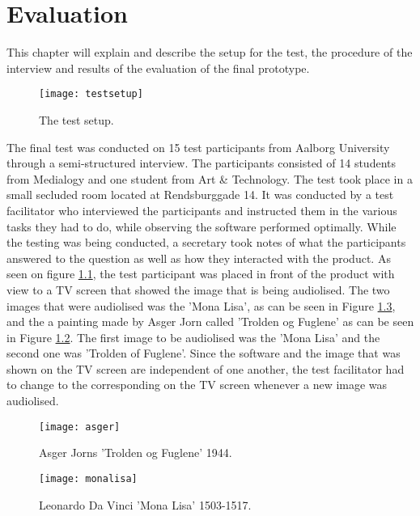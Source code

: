 \chapter{Evaluation}\label{ch:evaluation}

This chapter will explain and describe the setup for the test, the procedure of the interview and results of the evaluation of the final prototype. 

\begin{figure}[!h] 
\centering
\texttt{[image: testsetup]}
\caption{\label{fig:testsetup} The test setup.}
\end{figure}

The final test was conducted on 15 test participants from Aalborg University through a semi-structured interview. The participants consisted of 14 students from Medialogy and one student from Art \& Technology. The test took place in a small secluded room located at Rendsburggade 14. It was conducted by a test facilitator who interviewed the participants and instructed them in the various tasks they had to do, while observing the software performed optimally. While the testing was being conducted, a secretary took notes of what the participants answered to the question as well as how they interacted with the product.
As seen on figure \ref{fig:testsetup}, the test participant was placed in front of the product with view to a TV screen that showed the image that is being audiolised. The two images that were audiolised was the 'Mona Lisa', as can be seen in Figure \ref{fig:monalisa}, and the a painting made by Asger Jorn called 'Trolden og Fuglene' as can be seen in Figure \ref{fig:asger}. The first image to be audiolised was the 'Mona Lisa' and the second one was 'Trolden of Fuglene'. Since the software and the image that was shown on the TV screen are independent of one another, the test facilitator had to change to the corresponding on the TV screen whenever a new image was audiolised. 

\begin{figure}[!h] 
\centering
\texttt{[image: asger]}
\caption{\label{fig:asger} Asger Jorns 'Trolden og Fuglene' 1944.}
\end{figure}

\begin{figure}[!h] 
\centering
\texttt{[image: monalisa]}
\caption{\label{fig:monalisa} Leonardo Da Vinci 'Mona Lisa' 1503-1517.}
\end{figure}

